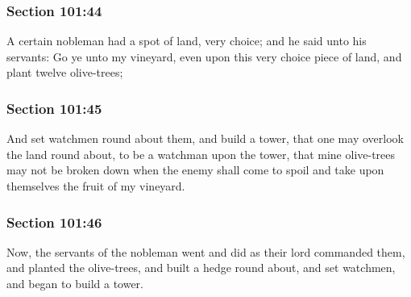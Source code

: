 	\subsubsection{Section 101:44} %
		\label{DC101-44}

		A certain nobleman had a spot of land, very choice; and he said unto his servants: Go ye unto my vineyard, even upon this very choice piece of land, and plant twelve olive-trees;


	\subsubsection{Section 101:45} %
		\label{DC101-45}

		And set watchmen round about them, and build a tower, that one may overlook the land round about, to be a watchman upon the tower, that mine olive-trees may not be broken down when the enemy shall come to spoil and take upon themselves the fruit of my vineyard.


	\subsubsection{Section 101:46} %
		\label{DC101-46}

		Now, the servants of the nobleman went and did as their lord commanded them, and planted the olive-trees, and built a hedge round about, and set watchmen, and began to build a tower.


